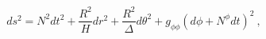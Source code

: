\begin{equation}
\label{kds}
ds^2 = N^2 dt^2 + \frac{R^2}{H}dr^2 + \frac{R^2}{\Delta}d\theta^2
+ g_{\phi\phi}(d\phi+N^{\phi}dt)^2 \ ,
\end{equation}

